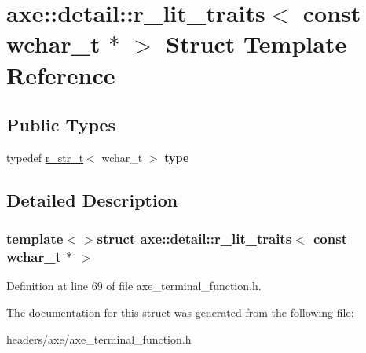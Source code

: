\hypertarget{structaxe_1_1detail_1_1r__lit__traits_3_01const_01wchar__t_01_5_01_4}{\section{axe\+:\+:detail\+:\+:r\+\_\+lit\+\_\+traits$<$ const wchar\+\_\+t $\ast$ $>$ Struct Template Reference}
\label{structaxe_1_1detail_1_1r__lit__traits_3_01const_01wchar__t_01_5_01_4}
}
\subsection*{Public Types}
\begin{DoxyCompactItemize}
\item 
\hypertarget{structaxe_1_1detail_1_1r__lit__traits_3_01const_01wchar__t_01_5_01_4_a28de574caef5d26d162334387ce2edbb}{typedef \hyperlink{classaxe_1_1r__str__t}{r\+\_\+str\+\_\+t}$<$ wchar\+\_\+t $>$ {\bfseries type}}\label{structaxe_1_1detail_1_1r__lit__traits_3_01const_01wchar__t_01_5_01_4_a28de574caef5d26d162334387ce2edbb}

\end{DoxyCompactItemize}


\subsection{Detailed Description}
\subsubsection*{template$<$$>$struct axe\+::detail\+::r\+\_\+lit\+\_\+traits$<$ const wchar\+\_\+t $\ast$ $>$}



Definition at line 69 of file axe\+\_\+terminal\+\_\+function.\+h.



The documentation for this struct was generated from the following file\+:\begin{DoxyCompactItemize}
\item 
headers/axe/axe\+\_\+terminal\+\_\+function.\+h\end{DoxyCompactItemize}
